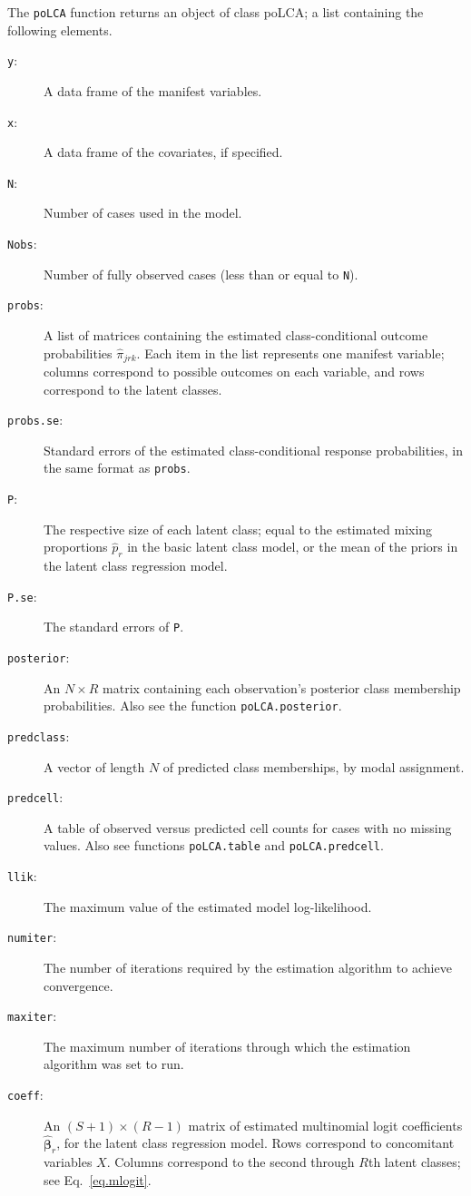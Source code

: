 \documentclass[letterpaper,12pt]{article}
\begin{document}
The \texttt{poLCA} function returns an object of class poLCA; a list containing the following elements.
\begin{description}
    \item [\texttt{y}:] A data frame of the manifest variables.
    \item [\texttt{x}:] A data frame of the covariates, if specified.
    \item [\texttt{N}:] Number of cases used in the model.
    \item [\texttt{Nobs}:] Number of fully observed cases (less than or equal to \texttt{N}).
    \item [\texttt{probs}:] A list of matrices containing the estimated class-conditional outcome probabilities $\hat \pi_{jrk}$. Each item in the list represents one manifest variable; columns correspond to possible outcomes on each variable, and rows correspond to the latent classes.
    \item [\texttt{probs.se}:] Standard errors of the estimated class-conditional response probabilities, in the same format as \texttt{probs}.
    \item [\texttt{P}:] The respective size of each latent class; equal to the estimated mixing proportions $\hat p_r$ in the basic latent class model, or the mean of the priors in the latent class regression model.
    \item [\texttt{P.se}:] The standard errors of \texttt{P}.
    \item [\texttt{posterior}:] An $N \times R$ matrix containing each observation's posterior class membership probabilities. Also see the function \texttt{poLCA.posterior}.
    \item [\texttt{predclass}:] A vector of length $N$ of predicted class memberships, by modal assignment.
    \item [\texttt{predcell}:] A table of observed versus predicted cell counts for cases with no missing values.  Also see functions \texttt{poLCA.table} and \texttt{poLCA.predcell}.
    \item [\texttt{llik}:] The maximum value of the estimated model log-likelihood.
    \item [\texttt{numiter}:] The number of iterations required by the estimation algorithm to achieve convergence.
    \item [\texttt{maxiter}:] The maximum number of iterations through which the estimation algorithm was set to run.
    \item [\texttt{coeff}:] An $(S+1) \times (R-1)$ matrix of estimated multinomial logit coefficients $\boldsymbol{\hat \beta}_r$, for the latent class regression model.  Rows correspond to concomitant variables $X$. Columns correspond to the second through $R$th latent classes; see Eq.~\ref{eq.mlogit}.

\end{description}
\end{document}
